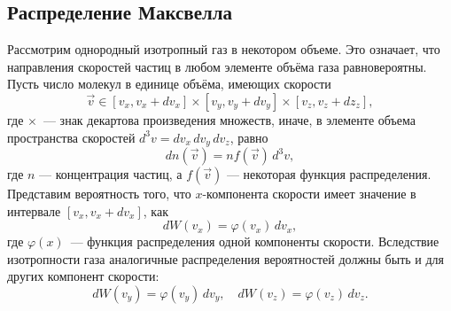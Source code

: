 \subsection{Распределение Максвелла}

Рассмотрим однородный изотропный газ в некотором объеме. Это означает, что направления скоростей частиц в любом элементе объ­ёма газа равновероятны. Пусть число молекул в единице объёма, имеющих скорости
\begin{equation*}
	\vec{v} \in [v_x, v_x + d v_x] \times [v_y, v_y + d v_y] \times [v_z, v_z + d z_z],
\end{equation*}
где $\times$~--- знак декартова произведения множеств, иначе, в элементе объема пространства скоростей $d^3 v = d v_x \, d v_y \, d v_z$, равно
\begin{equation*}
	d n(\vec{v}) = n f(\vec{v}) \, d^3 v,
\end{equation*}
где $n$ — концентрация частиц, а $f(\vec{v})$ — некоторая функция распределения.
Представим вероятность того, что $x$-компонента скорости имеет значение в интервале $[v_x, v_x + d v_x]$, как
\begin{equation*}
	d W (v_x) = \varphi(v_x) \, d v_x,
\end{equation*}
где $\varphi(x)$~--- функция распределения одной компоненты скорости. Вследствие изотропности газа аналогичные распределения вероятностей должны быть и для других компонент скорости:
\begin{equation*}
	d W(v_y) = \varphi(v_y) \, d v_y, \quad 
	d W(v_z) =\varphi(v_z) \, d v_z.
\end{equation*}

